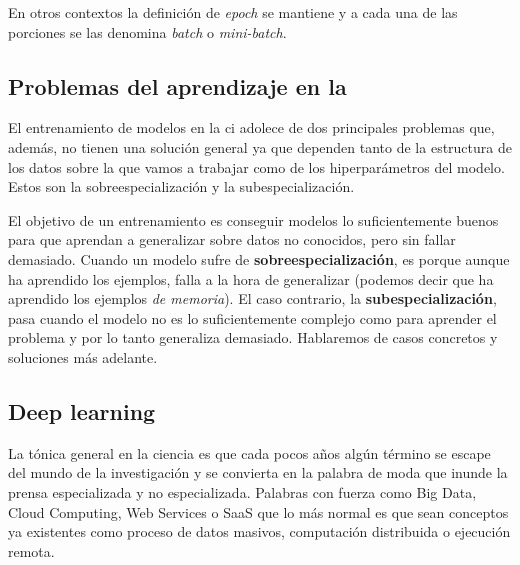 En otros contextos la definición de \textit{epoch} se mantiene y a cada una de las porciones se las denomina \textit{batch} o \textit{mini-batch}.

\subsection{Problemas del aprendizaje en la }

El entrenamiento de modelos en la \gls{ci} adolece de dos principales problemas que, además, no tienen una solución general ya que dependen tanto de la estructura de los datos sobre la que vamos a trabajar como de los hiperparámetros del modelo. Estos son la sobreespecialización y la subespecialización.

El objetivo de un entrenamiento es conseguir modelos lo suficientemente buenos para que aprendan a generalizar sobre datos no conocidos, pero sin fallar demasiado. Cuando un modelo sufre de \textbf{sobreespecialización}, es porque aunque ha aprendido los ejemplos, falla a la hora de generalizar (podemos decir que ha aprendido los ejemplos \textit{de memoria}). El caso contrario, la \textbf{subespecialización}, pasa cuando el modelo no es lo suficientemente complejo como para aprender el problema y por lo tanto generaliza demasiado. Hablaremos de casos concretos y soluciones más adelante.

\subsection{Deep learning}
\label{ss:deep-learning}

La tónica general en la ciencia es que cada pocos años algún término se escape del mundo de la investigación y se convierta en la palabra de moda que inunde la prensa especializada y no especializada. Palabras con fuerza como Big Data, Cloud Computing, Web Services o SaaS que lo más normal es que sean conceptos ya existentes como proceso de datos masivos, computación distribuida o ejecución remota.

